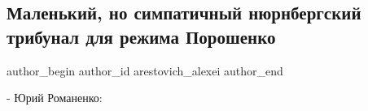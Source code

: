  
 
 
 
 
 
\subsection{Маленький, но симпатичный нюрнбергский трибунал для режима Порошенко}
\label{sec:08_06_2021.fb.arestovich_alexei.1.tribunal_rezhim_poroshenko_romanenko}
\ifcmt
 author_begin
   author_id arestovich_alexei
 author_end
\fi

- Юрий Романенко:

